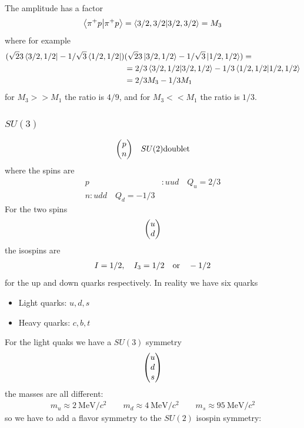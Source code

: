 \documentclass[../main.tex]{subfiles}
\begin{document}
The amplitude has a factor
\begin{align*}
    \braket{\pi^+ p}{\pi^+ p} = \braket{3/2, 3/2}{3/2, 3/2} = M_3
\end{align*}
where for example 
\begin{align*}
    (\sqrt{2}{3} \bra{3/2, 1/2} - 1/\sqrt{3} \bra{1/2, 1/2})
    &(\sqrt{2}{3} \ket{3/2, 1/2} - 1/\sqrt{3} \ket{1/2, 1/2}) = \\
    &= 2/3 \braket{3/2, 1/2}{3/2, 1/2} - 1/3 \braket{1/2, 1/2}{1/2, 1/2} \\
    &= 2/3 M_3 - 1/3 M_1
\end{align*}
for $M_3 >> M_1$ the ratio is $4/9$, and for $M_3 << M_1$ the ratio is $1/3$.

\subsubsection*{$SU(3)$}
\begin{align*}
    \mqty(p \\ n) \quad SU(2) \textrm{doublet}
\end{align*}
where the spins are
\begin{align*}
    p&: uud \quad Q_u = 2/3 \\
    n: udd \quad Q_d = -1/3
\end{align*}
For the two spins
\begin{align*}
    \mqty(u \\ d)
\end{align*}
the isospins are
\begin{align*}
    I = 1/2, \quad I_3 = 1/2 \qor -1/2
\end{align*}
for the up and down quarks respectively. In reality we have six quarks
\begin{itemize}
    \item Light quarks: $u, d, s$
    \item Heavy quarks: $c, b, t$
\end{itemize}
For the light quaks we have a $SU(3)$ symmetry
\begin{align*}
    \mqty(u \\ d \\ s)
\end{align*}
the masses are all different:
\begin{align*}
    m_u \approx \qty{2}{\MeV / c^2} \qquad 
    m_d \approx \qty{4}{\MeV / c^2} \qquad 
    m_s \approx \qty{95}{\MeV / c^2}
\end{align*}
so we have to add a flavor symmetry to the $SU(2)$ isospin symmetry:
\end{document}

